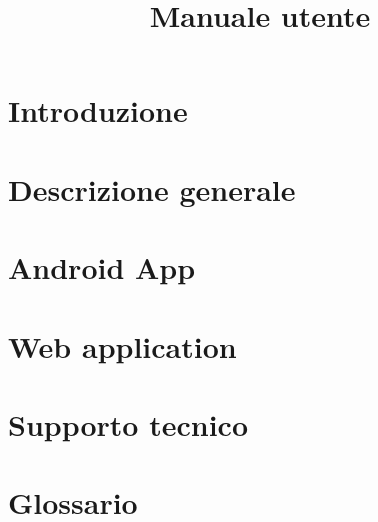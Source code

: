 \documentclass{article}
\title{Manuale utente}
\begin{document}


\section{Introduzione}%
\label{sec:introduzione}


\newpage
\section{Descrizione generale}%
\label{sec:descrizione_generale}


\newpage
\section{Android App}%
\label{sec:mobile_app}


\newpage
\section{Web application}%
\label{sec:web_application}


\newpage
\section{Supporto tecnico}%
\label{sec:supporto_tecnico}


\newpage
\appendix
\section{Glossario}%
\label{sec:glossario}

\end{document}
